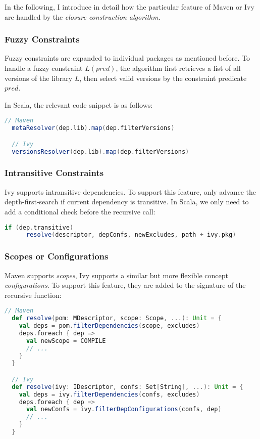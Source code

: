In the following, I introduce in detail how the particular feature of Maven or Ivy are handled by the \emph{closure construction algorithm}.

\subsubsection{Fuzzy Constraints}

Fuzzy constraints are expanded to individual packages as mentioned before. To handle a fuzzy constraint $L(pred)$, the algorithm first retrieves a list of all versions of the library $L$, then select valid versions by the constraint predicate $pred$.

In Scala, the relevant code snippet is as follows:

\begin{lstlisting}[language=Scala]
  // Maven
  metaResolver(dep.lib).map(dep.filterVersions)

  // Ivy
  versionsResolver(dep.lib).map(dep.filterVersions)
\end{lstlisting}

\subsubsection{Intransitive Constraints}

Ivy supports intransitive dependencies. To support this feature, only advance the depth-first-search if current dependency is transitive. In Scala, we only need to add a conditional check before the recursive call:

\begin{lstlisting}[language=Scala]
  if (dep.transitive)
      resolve(descriptor, depConfs, newExcludes, path + ivy.pkg)
\end{lstlisting}

\subsubsection{Scopes or Configurations}

Maven supports \emph{scopes}, Ivy supports a similar but more flexible concept \emph{configurations}. To support this feature, they are added to the signature of the recursive function:

\begin{lstlisting}[language=Scala]
  // Maven
  def resolve(pom: MDescriptor, scope: Scope, ...): Unit = {
    val deps = pom.filterDependencies(scope, excludes)
    deps.foreach { dep =>
      val newScope = COMPILE
      // ...
    }
  }

  // Ivy
  def resolve(ivy: IDescriptor, confs: Set[String], ...): Unit = {
    val deps = ivy.filterDependencies(confs, excludes)
    deps.foreach { dep =>
      val newConfs = ivy.filterDepConfigurations(confs, dep)
      // ...
    }
  }
\end{lstlisting}


